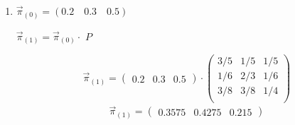 \documentclass{templateNote}
\begin{document}
\begin{enumerate}[label=\alph*)]
    \item $\vec{\pi}_{(0)} = (0.2 \quad 0.3 \quad 0.5)$
    
    \begin{center}
        $\vec{\pi}_{(1)} = \vec{\pi}_{(0)} \cdot$ $P$    
    \end{center}
    

    \begin{equation*}
        \vec{\pi}_{(1)} = 
        \begin{pmatrix}
            0.2 & 0.3 & 0.5
        \end{pmatrix}
        \cdot
        \begin{pmatrix}
            3/5 & 1/5 & 1/5 \\
            1/6 & 2/3 & 1/6 \\
            3/8 & 3/8 & 1/4 \\
        \end{pmatrix}
    \end{equation*}
    \begin{align*}
        \vec{\pi}_{(1)} = 
        \begin{pmatrix}
            0.3575 & 0.4275 & 0.215
        \end{pmatrix}
    \end{align*}


\end{enumerate}
\end{document}
